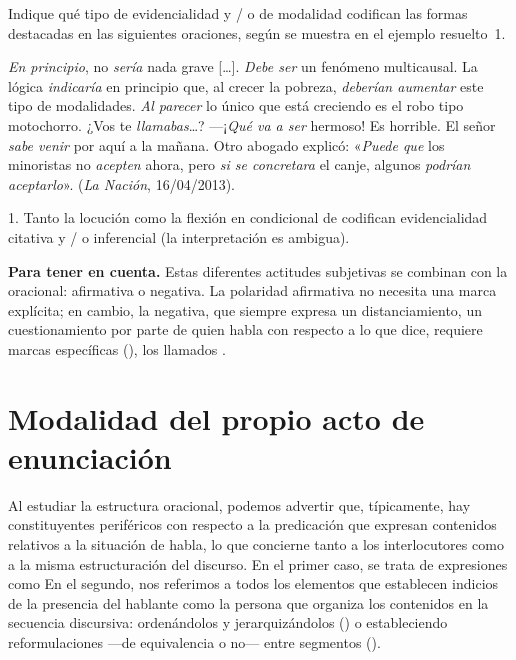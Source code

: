 \begin{ejercicio}\label{ej:14-evidenciales}
Indique qué tipo de evidencialidad y / o de modalidad codifican las formas
destacadas en las siguientes oraciones, según se muestra en el ejemplo
resuelto~1.

\begin{exe}
  \ex \textit{En principio}, no \textit{sería} nada grave [\ldots].
  \ex \textit{Debe ser} un fenómeno multicausal. La lógica \textit{indicaría} en
      principio que, al crecer la pobreza, \textit{deberían aumentar} este tipo
      de modalidades. \textit{Al parecer} lo único que está creciendo es el robo
      tipo motochorro.
  \ex ¿Vos te \textit{llamabas}\ldots?
  \ex ---¡\textit{Qué va a ser} hermoso! Es horrible.
  \ex El señor \textit{sabe venir} por aquí a la mañana.
  \ex Otro abogado explicó: «\textit{Puede que} los minoristas no \textit{acepten}
      ahora, pero \textit{si se concretara} el canje, algunos \textit{podrían
      aceptarlo}». (\textit{La Nación}, 16/04/2013).
\end{exe}

\begin{resuelto}
1. Tanto la locución  como la flexión en condicional de
 codifican evidencialidad citativa y / o inferencial (la
interpretación es ambigua).
\end{resuelto}
\end{ejercicio}

\begin{destacado}
\textbf{Para tener en cuenta.} Estas diferentes actitudes subjetivas se combinan
con la  oracional: afirmativa o negativa. La polaridad
afirmativa no necesita una marca explícita; en cambio, la negativa, que siempre
expresa un distanciamiento, un cuestionamiento por parte de quien habla con
respecto a lo que dice, requiere marcas específicas (), los llamados .
\end{destacado}

\section{Modalidad del propio acto de enunciación}\label{sec:14-enunciacion}

Al estudiar la estructura oracional, podemos advertir que, típicamente, hay
constituyentes periféricos con respecto a la predicación que expresan contenidos
relativos a la situación de habla, lo que concierne tanto a los interlocutores
como a la misma estructuración del discurso. En el primer caso, se trata de
expresiones como  En el segundo, nos referimos a todos los elementos que establecen
indicios de la presencia del hablante como la persona que organiza los
contenidos en la secuencia discursiva: ordenándolos y jerarquizándolos
() o estableciendo
reformulaciones ---de equivalencia o no--- entre segmentos ().

